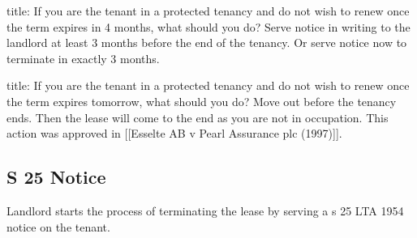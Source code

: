 \documentclass[
]{article}
\newenvironment{Shaded}{}{}
\newcommand{\NormalTok}[1]{#1}
\begin{document}
\begin{Shaded}
\begin{Highlighting}[]
\NormalTok{title: If you are the tenant in a protected tenancy and do not wish to renew once the term expires in 4 months, what should you do?}
\NormalTok{Serve notice in writing to the landlord at least 3 months before the end of the tenancy. Or serve notice now to terminate in exactly 3 months. }
\end{Highlighting}
\end{Shaded}

\begin{Shaded}
\begin{Highlighting}[]
\NormalTok{title: If you are the tenant in a protected tenancy and do not wish to renew once the term expires tomorrow, what should you do?}
\NormalTok{Move out before the tenancy ends. Then the lease will come to the end as you are not in occupation. This action was approved in [[Esselte AB v Pearl Assurance plc (1997)]].}
\end{Highlighting}
\end{Shaded}

\hypertarget{s-25-notice}{%
\subsection{S 25 Notice}\label{s-25-notice}}

Landlord starts the process of terminating the lease by serving a s 25
LTA 1954 notice on the tenant.
\end{document}
